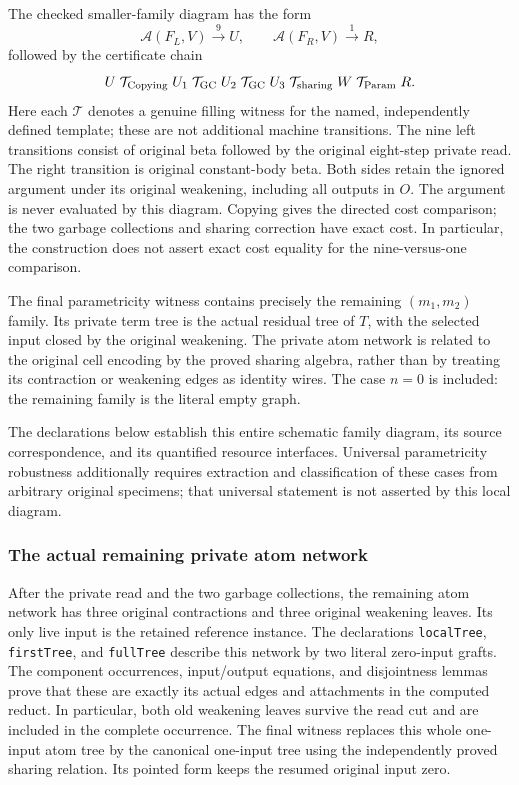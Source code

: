 The checked smaller-family diagram has the form
\[
 \mathcal A(F_L,V)\xrightarrow{9} U,
 \qquad
 \mathcal A(F_R,V)\xrightarrow{1} R,
\]
followed by the certificate chain
\[
 U\mathrel{\mathcal T_{\rm Copying}}U_1
 \mathrel{\mathcal T_{\rm GC}}U_2
 \mathrel{\mathcal T_{\rm GC}}U_3
 \mathrel{\mathcal T_{\rm sharing}}W
 \mathrel{\mathcal T_{\rm Param}}R.
\]
Here each $\mathcal T$ denotes a genuine filling witness for the named, independently defined template; these are not additional machine transitions.  The nine left transitions consist of original beta followed by the original eight-step private read.  The right transition is original constant-body beta.  Both sides retain the ignored argument under its original weakening, including all outputs in $O$.  The argument is never evaluated by this diagram.  Copying gives the directed cost comparison; the two garbage collections and sharing correction have exact cost.  In particular, the construction does not assert exact cost equality for the nine-versus-one comparison.

The final parametricity witness contains precisely the remaining $(m_1,m_2)$ family.  Its private term tree is the actual residual tree of $T$, with the selected input closed by the original weakening.  The private atom network is related to the original cell encoding by the proved sharing algebra, rather than by treating its contraction or weakening edges as identity wires.  The case $n=0$ is included: the remaining family is the literal empty graph.

The declarations below establish this entire schematic family diagram, its source correspondence, and its quantified resource interfaces.  Universal parametricity robustness additionally requires extraction and classification of these cases from arbitrary original specimens; that universal statement is not asserted by this local diagram.

\subsubsection{The actual remaining private atom network}
After the private read and the two garbage collections, the remaining atom network has three original contractions and three original weakening leaves.  Its only live input is the retained reference instance.  The declarations \texttt{localTree}, \texttt{firstTree}, and \texttt{fullTree} describe this network by two literal zero-input grafts.  The component occurrences, input/output equations, and disjointness lemmas prove that these are exactly its actual edges and attachments in the computed reduct.  In particular, both old weakening leaves survive the read cut and are included in the complete occurrence.  The final witness replaces this whole one-input atom tree by the canonical one-input tree using the independently proved sharing relation.  Its pointed form keeps the resumed original input zero.

